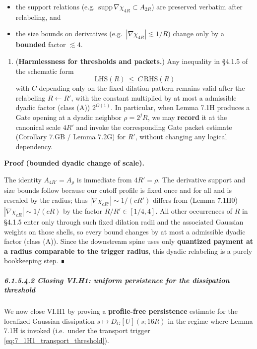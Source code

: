 \documentclass[
  11pt,
]{article}
\providecommand{\tightlist}{%
  \setlength{\itemsep}{0pt}\setlength{\parskip}{0pt}}
\begin{document}
\begin{itemize}
\tightlist
\item
  the support relations (e.g.~\(\mathrm{supp}\,\nabla\chi_{4R}\subset A_{2R}\)) are preserved verbatim after relabeling, and
\item
  the size bounds on derivatives (e.g.~\(|\nabla\chi_{4R}|\lesssim 1/R\)) change only by a \textbf{bounded} factor \(\lesssim 4\).
\end{itemize}

\begin{enumerate}
\def\labelenumi{\arabic{enumi}.}
\setcounter{enumi}{2}
\tightlist
\item
  (\textbf{Harmlessness for thresholds and packets.}) Any inequality in §4.1.5 of the schematic form \[
  \text{LHS}(R)\ \le\ C\,\text{RHS}(R)
  \] with \(C\) depending only on the fixed dilation pattern remains valid after the relabeling \(R\leftarrow R'\), with the constant multiplied by at most a admissible dyadic factor (class (A)) \(2^{O(1)}\). In particular, when Lemma 7.1H produces a Gate opening at a dyadic neighbor \(\rho=2^jR\), we may \textbf{record} it at the canonical scale \(4R'\) and invoke the corresponding Gate packet estimate (Corollary 7.GB / Lemma 7.2G) for \(R'\), without changing any logical dependency.
\end{enumerate}

\textbf{Proof (bounded dyadic change of scale).}

The identity \(A_{4R'}=A_{\rho}\) is immediate from \(4R'=\rho\). The derivative support and size bounds follow because our cutoff profile is fixed once and for all and is rescaled by the radius; thus \(|\nabla\chi_{cR'}|\sim 1/(cR')\) differs from (Lemma 7.1H0) \(|\nabla\chi_{cR}|\sim 1/(cR)\) by the factor \(R/R'\in[1/4,4]\). All other occurrences of \(R\) in §4.1.5 enter only through such fixed dilation radii and the associated Gaussian weights on those shells, so every bound changes by at most a admissible dyadic factor (class (A)). Since the downstream spine uses only \textbf{quantized payment at a radius comparable to the trigger radius}, this dyadic relabeling is a purely bookkeeping step. ∎

\hypertarget{closing-vi.h1-uniform-persistence-for-the-dissipation-threshold}{%
\subparagraph{6.1.5.4.2 Closing VI.H1: uniform persistence for the dissipation threshold}\label{closing-vi.h1-uniform-persistence-for-the-dissipation-threshold}}

We now close VI.H1 by proving a \textbf{profile-free persistence} estimate for the localized Gaussian dissipation \(s\mapsto D_G[U](s;16R)\) in the regime where Lemma 7.1H is invoked (i.e.~under the transport trigger \eqref{eq:7_1H1_transport_threshold}).
\end{document}
